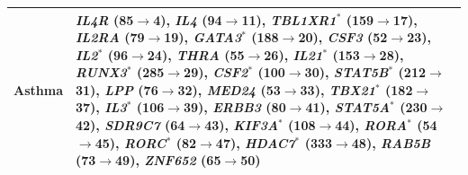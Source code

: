 \begin{table}[!htbp]
\begin{tabular*}{\linewidth}{@{\extracolsep{\fill}}p{}>{\raggedright\arraybackslash}p{}}
Asthma & \textbf{\textit{IL4R}} (85$\rightarrow$4), \textbf{\textit{IL4}} (94$\rightarrow$11), \textit{TBL1XR1}$^\ast$ (159$\rightarrow$17), \textbf{\textit{IL2RA}} (79$\rightarrow$19), \textit{GATA3}$^\ast$ (188$\rightarrow$20), \textit{CSF3} (52$\rightarrow$23), \textit{IL2}$^\ast$ (96$\rightarrow$24), \textit{THRA} (55$\rightarrow$26), \textit{IL21}$^\ast$ (153$\rightarrow$28), \textit{RUNX3}$^\ast$ (285$\rightarrow$29), \textit{CSF2}$^\ast$ (100$\rightarrow$30), \textit{STAT5B}$^\ast$ (212$\rightarrow$31), \textit{LPP} (76$\rightarrow$32), \textit{MED24} (53$\rightarrow$33), \textit{TBX21}$^\ast$ (182$\rightarrow$37), \textit{IL3}$^\ast$ (106$\rightarrow$39), \textit{ERBB3} (80$\rightarrow$41), \textit{STAT5A}$^\ast$ (230$\rightarrow$42), \textit{SDR9C7} (64$\rightarrow$43), \textit{KIF3A}$^\ast$ (108$\rightarrow$44), \textit{RORA}$^\ast$ (54$\rightarrow$45), \textit{RORC}$^\ast$ (82$\rightarrow$47), \textit{HDAC7}$^\ast$ (333$\rightarrow$48), \textit{RAB5B} (73$\rightarrow$49), \textit{ZNF652} (65$\rightarrow$50) \\
\hline
\end{tabular*}
\end{table}
